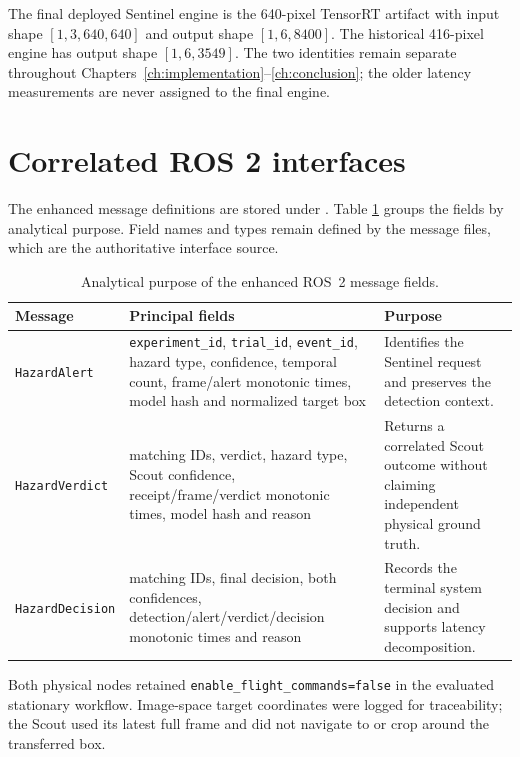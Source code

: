 The final deployed Sentinel engine is the 640-pixel TensorRT artifact with
input shape $[1,3,640,640]$ and output shape $[1,6,8400]$. The historical
416-pixel engine has output shape $[1,6,3549]$. The two identities remain
separate throughout Chapters~\ref{ch:implementation}--\ref{ch:conclusion}; the
older latency measurements are never assigned to the final engine.

\section{Correlated ROS 2 interfaces}

The enhanced message definitions are stored under
. Table
\ref{tab:appendix-interfaces} groups the fields by analytical purpose. Field
names and types remain defined by the message files, which are the authoritative
interface source.

\begin{table}[H]
  \centering
  \caption{Analytical purpose of the enhanced ROS~2 message fields.}
  \label{tab:appendix-interfaces}
  \scriptsize
  \begin{tabularx}{\textwidth}{@{}p{}p{}X@{}}
    \toprule
    Message & Principal fields & Purpose \\
    \midrule
    \texttt{HazardAlert} & \texttt{experiment\_id}, \texttt{trial\_id},
    \texttt{event\_id}, hazard type, confidence, temporal count, frame/alert
    monotonic times, model hash and normalized target box & Identifies the
    Sentinel request and preserves the detection context. \\
    \texttt{HazardVerdict} & matching IDs, verdict, hazard type, Scout
    confidence, receipt/frame/verdict monotonic times, model hash and reason &
    Returns a correlated Scout outcome without claiming independent physical
    ground truth. \\
    \texttt{HazardDecision} & matching IDs, final decision, both confidences,
    detection/alert/verdict/decision monotonic times and reason & Records the
    terminal system decision and supports latency decomposition. \\
    \bottomrule
  \end{tabularx}
\end{table}

Both physical nodes retained \texttt{enable\_flight\_commands=false} in the
evaluated stationary workflow. Image-space target coordinates were logged for
traceability; the Scout used its latest full frame and did not navigate to or
crop around the transferred box.

